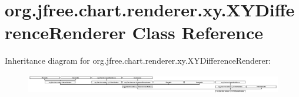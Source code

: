 \hypertarget{classorg_1_1jfree_1_1chart_1_1renderer_1_1xy_1_1_x_y_difference_renderer}{}\section{org.\+jfree.\+chart.\+renderer.\+xy.\+X\+Y\+Difference\+Renderer Class Reference}
\label{classorg_1_1jfree_1_1chart_1_1renderer_1_1xy_1_1_x_y_difference_renderer}
Inheritance diagram for org.\+jfree.\+chart.\+renderer.\+xy.\+X\+Y\+Difference\+Renderer\+:\begin{figure}[H]
\begin{center}
\leavevmode
\includegraphics[height=0.883281cm]{classorg_1_1jfree_1_1chart_1_1renderer_1_1xy_1_1_x_y_difference_renderer}
\end{center}
\end{figure}
